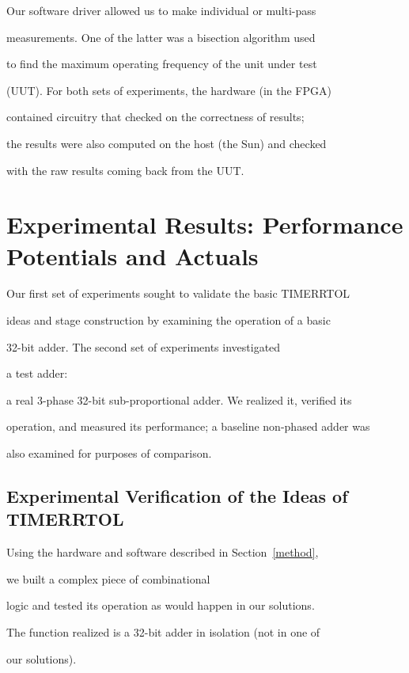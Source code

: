 \documentclass[12pt,dvips]{article}
\begin{document}
Our software driver allowed us to make individual or multi-pass

measurements. One of the latter was a bisection algorithm used

to find the maximum operating frequency of the unit under test

(UUT). For both sets of experiments, the hardware (in the FPGA)

contained circuitry that checked on the correctness of results;

the results were also computed on the host (the Sun) and checked

with the raw results coming back from the UUT.





\section{Experimental Results: Performance Potentials and Actuals}

Our first set of experiments sought to validate the basic TIMERRTOL

ideas and stage construction by examining the operation of a basic

32-bit adder. The second set of experiments investigated

a test adder:

a real 3-phase 32-bit sub-proportional adder. We realized it, verified its

operation, and measured its performance; a baseline non-phased adder was

also examined for purposes of comparison. 



\label{exp}

\subsection{Experimental Verification of the Ideas of TIMERRTOL}

Using the hardware and software described in Section~\ref{method},

we built a complex piece of combinational

logic and tested its operation as would happen in our solutions.



The function realized is a 32-bit adder in isolation (not in one of

our solutions).
\end{document}
